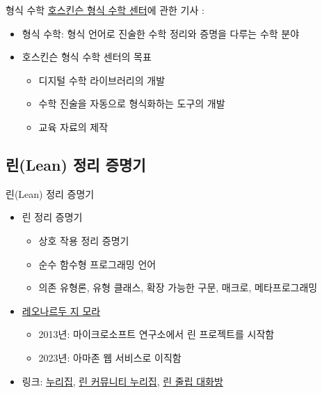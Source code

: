 \documentclass{beamer}
\begin{document}
\begin{frame}{형식 수학}
  \href{https://www.cmu.edu/hoskinson/index.html}{호스킨슨 형식 수학 센터}에
  관한 기사 \autocite{hoskinson}:
  \begin{itemize}
    \item 형식 수학: 형식 언어로 진술한 수학 정리와 증명을 다루는 수학 분야
    \item 호스킨슨 형식 수학 센터의 목표
    \begin{itemize}
      \item 디지털 수학 라이브러리의 개발
      \item 수학 진술을 자동으로 형식화하는 도구의 개발
      \item 교육 자료의 제작
    \end{itemize}
  \end{itemize}
\end{frame}

\subsection{린(Lean) 정리 증명기}

\begin{frame}{린(Lean) 정리 증명기}
  \begin{itemize}
    \item 린 정리 증명기
    \begin{itemize}
      \item 상호 작용 정리 증명기
      \item 순수 함수형 프로그래밍 언어
      \item 의존 유형론, 유형 클래스, 확장 가능한 구문, 매크로, 메타프로그래밍
    \end{itemize}
    \item \href{https://leodemoura.github.io/}{레오나르두 지 모라}
    \begin{itemize}
      \item 2013년: 마이크로소프트 연구소에서 린 프로젝트를 시작함
      \item 2023년: 아마존 웹 서비스로 이직함
    \end{itemize}
    \item 링크:
      \href{https://leanprover.github.io/}{누리집},
      \href{https://leanprover-community.github.io/index.html}{린 커뮤니티
        누리집},
      \href{https://leanprover.zulipchat.com/}{린 줄립 대화방}
  \end{itemize}
\end{frame}
\end{document}
